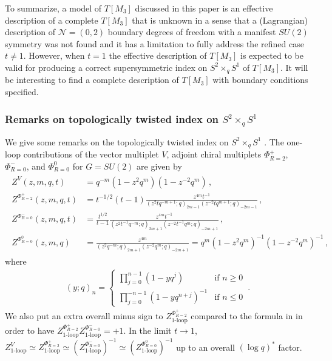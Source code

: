 \documentclass[11pt,hyper,a4paper]{article}
\begin{document}
To summarize, a model of $T[M_3]$ discussed in this paper is an effective description of a complete $T[M_3]$ that is unknown in a sense that a (Lagrangian) description of $\mathcal{N}=(0,2)$ boundary degrees of freedom with a manifest $SU(2)$ symmetry was not found and it has a limitation to fully address the refined case $t \neq 1$. 
However, when $t=1$ the effective description of $T[M_3]$ is expected to be valid for producing a correct supersymmetric index on $S^2 \times_q S^1$ of $T[M_3]$.
It will be interesting to find a complete description of $T[M_3]$ with boundary conditions specified.






\subsubsection*{Remarks on topologically twisted index on $S^2 \times_q S^1$}

We give some remarks on the topologically twisted index on $S^2 \times_q S^1$ \cite{Benini-Zaffaroni}.
The one-loop contributions of the vector multiplet $V$, adjoint chiral multiplets $\Phi_{R=2}^{+}$, $\Phi_{R=0}^{-}$, and $\Phi_{R=0}^{0}$ for $G=SU(2)$ are given by
\begin{eqnarray}
\begin{split}
Z^{V} (z,m,q,t) &= q^{-m} (1 - z^2 q^m) (1 - z^{-2} q^m)	\,	,		\\
Z^{\Phi_{R=2}^{+}} (z,m,q,t) &= t^{-1/2} (t-1) \frac{z^{4m} t^{-1}}{ (z^2 t q^{-m+1};q)_{2m-1} (z^{-2} t q^{m+1};q)_{-2m-1} } 	\,	,		\\	
Z^{\Phi_{R=0}^{-}} (z,m,q,t) &= \frac{t^{1/2}}{t-1}\frac{z^{4m} t^{-1}}{ (z^2 t^{-1} q^{-m};q)_{2m+1} (z^{-2} t^{-1} q^{m};q)_{-2m+1} } 	\,	,		\\
Z^{\Phi_{R=0}^{0}} (z,m,q) &= \frac{z^{4m} }{ (z^2 q^{-m};q)_{2m+1} (z^{-2} q^{m};q)_{-2m+1} }  = q^{m} (1 - z^2 q^m)^{-1} (1 - z^{-2} q^m)^{-1}		\,	,
\end{split}
\end{eqnarray}
where 
\begin{align}
(y;q)_n = 
\begin{cases}
\prod_{j=0}^{n-1}(1-yq^j)			&\text{if } n \geq 0	\\
\prod_{j=0}^{-n-1} (1- yq^{n+j})^{-1}	&\text{if } n \leq 0
\end{cases}
\,	.
\end{align}
We also put an extra overall minus sign to $Z_{\text{1-loop}}^{\Phi_{R=2}^{+}}$ compared to the formula in \cite{Benini-Zaffaroni} in order to have $Z_{\text{1-loop}}^{\Phi_{R=2}^{+}} Z_{\text{1-loop}}^{\Phi_{R=0}^{-}} = +1$.
In the limit $t \rightarrow 1$, $Z_{\text{1-loop}}^{V} \simeq Z_{\text{1-loop}}^{\Phi_{R=2}^{+}} \simeq (Z_{\text{1-loop}}^{\Phi_{R=0}^{-}})^{-1} \simeq (Z_{\text{1-loop}}^{\Phi_{R=0}^{0}})^{-1}$ up to an overall $(\log q)^*$ factor.
\end{document}
